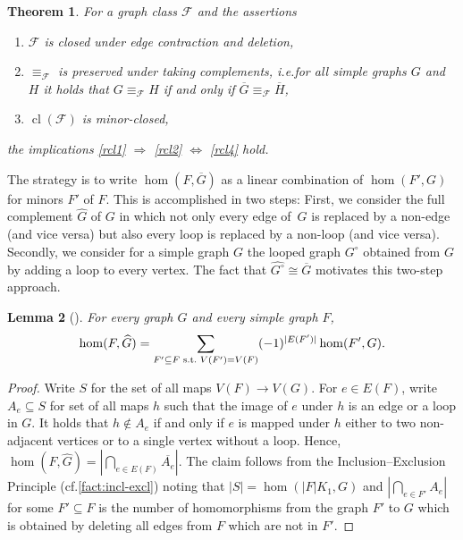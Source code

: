 \documentclass[3p,final]{elsarticle}
\DeclareMathOperator{\cl}{cl}
\newtheorem{theorem}{Theorem}
\newtheorem{lemma}[theorem]{Lemma}
\begin{document}
	\begin{theorem}
		\label{thm:complement}
		For a graph class $\mathcal{F}$ and the assertions
		\begin{enumerate}
			\item $\mathcal{F}$ is closed under edge contraction and deletion,\label{rcl1}
			\item $\equiv_{\mathcal{F}}$ is \emph{preserved under taking complements}, i.e.\@ for all simple graphs $G$ and $H$ it holds that $G \equiv_{\mathcal{F}} H$ if and only if $\overline{G} \equiv_{\mathcal{F}} \overline{H}$,\label{rcl2}
\item $\cl(\mathcal{F})$ is minor-closed,\label{rcl4}
		\end{enumerate}
		the implications \ref{rcl1} $\Rightarrow$ \ref{rcl2} $\Leftrightarrow$ \ref{rcl4} hold.
	\end{theorem}

	The strategy is to write $\hom(F, \overline{G})$ as a linear combination of $\hom(F', G)$ for minors $F'$ of $F$.
	This is accomplished in two steps: First, we consider the full complement $\widehat{G}$ of $G$ in which not only every edge of~$G$ is replaced by a non-edge (and vice versa) but also every loop is replaced by a non-loop (and vice versa). Secondly, we consider for a simple graph $G$ the looped graph $G^\circ$ obtained from $G$ by adding a loop to every vertex.
	The fact that $\widehat{G^\circ} \cong \overline{G}$ motivates this two-step approach. 
	
	\begin{lemma}[{\cite[Equation~(5.23)]{lovasz_large_2012}}] \label{eq:complement}
		For every  graph $G$ and every simple graph $F$,
		\[
		\hom(F, \widehat{G}) = \sum_{F' \subseteq F \text{ s.t.\@ }V(F') = V(F)} (-1)^{|E(F')|} \hom(F', G).
		\]
	\end{lemma}
	\begin{proof}Write $S$ for the set of all maps $V(F) \to V(G)$. For $e \in E(F)$, write $A_e \subseteq S$ for set of all maps $h$ such that the image of $e$ under $h$ is an edge or a loop in $G$.
		It holds that $h \not\in A_e$ if and only if $e$ is mapped under $h$ either to two non-adjacent vertices or to a single vertex without a loop.
		Hence, $\hom(F, \widehat{G}) = \left\lvert \bigcap_{e \in E(F)} \overline{A_e} \right\rvert$.
		The claim follows from the Inclusion--Exclusion Principle (cf.\@ \cref{fact:incl-excl}) noting that $|S| = \hom(|F|K_1, G)$ and $\left\lvert \bigcap_{e \in F'} A_e \right\rvert$ for some $F' \subseteq F$ is the number of homomorphisms from the graph $F'$ to $G$ which is obtained by deleting all edges from $F$ which are not in $F'$.
	\end{proof}
	
\end{document}
